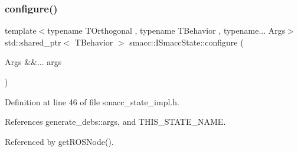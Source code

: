 \subsubsection{\texorpdfstring{configure()}{configure()}}
{\footnotesize\ttfamily template$<$typename T\+Orthogonal , typename T\+Behavior , typename... Args$>$ \\
std\+::shared\+\_\+ptr$<$ T\+Behavior $>$ smacc\+::\+I\+Smacc\+State\+::configure (\begin{DoxyParamCaption}\item[{Args \&\&...}]{args }\end{DoxyParamCaption})}



Definition at line 46 of file smacc\+\_\+state\+\_\+impl.\+h.



References generate\+\_\+debs\+::args, and T\+H\+I\+S\+\_\+\+S\+T\+A\+T\+E\+\_\+\+N\+A\+ME.



Referenced by get\+R\+O\+S\+Node().


